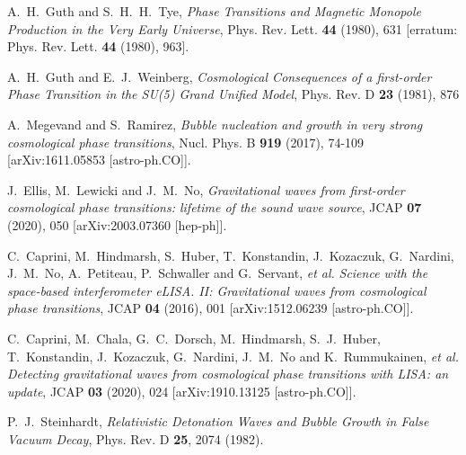 \documentclass[a4paper,11pt]{article}
\begin{document}
\begin{thebibliography}{99}
A.~H.~Guth and S.~H.~H.~Tye,
{\em Phase Transitions and Magnetic Monopole Production in the Very Early Universe},
Phys. Rev. Lett. \textbf{44} (1980), 631
[erratum: Phys. Rev. Lett. \textbf{44} (1980), 963].

A.~H.~Guth and E.~J.~Weinberg,
{\em Cosmological Consequences of a first-order Phase Transition in the SU(5) Grand Unified Model},
Phys. Rev. D \textbf{23} (1981), 876

A.~Megevand and S.~Ramirez,
{\em Bubble nucleation and growth in very strong cosmological phase transitions},
Nucl. Phys. B \textbf{919} (2017), 74-109
[arXiv:1611.05853 [astro-ph.CO]].

J.~Ellis, M.~Lewicki and J.~M.~No,
{\em Gravitational waves from first-order cosmological phase transitions: lifetime of the sound wave source},
JCAP \textbf{07} (2020), 050
[arXiv:2003.07360 [hep-ph]].


C.~Caprini, M.~Hindmarsh, S.~Huber, T.~Konstandin, J.~Kozaczuk, G.~Nardini, J.~M.~No, A.~Petiteau, P.~Schwaller and G.~Servant, \textit{et al.}
{\em Science with the space-based interferometer eLISA. II: Gravitational waves from cosmological phase transitions},
JCAP \textbf{04} (2016), 001
[arXiv:1512.06239 [astro-ph.CO]].

C.~Caprini, M.~Chala, G.~C.~Dorsch, M.~Hindmarsh, S.~J.~Huber, T.~Konstandin, J.~Kozaczuk, G.~Nardini, J.~M.~No and K.~Rummukainen, \textit{et al.}
{\em Detecting gravitational waves from cosmological phase transitions with LISA: an update},
JCAP \textbf{03} (2020), 024
[arXiv:1910.13125 [astro-ph.CO]].

P.~J.~Steinhardt,
{\em Relativistic Detonation Waves and Bubble Growth in False Vacuum Decay},
Phys. Rev. D \textbf{25}, 2074 (1982).


\end{thebibliography}
\end{document}
